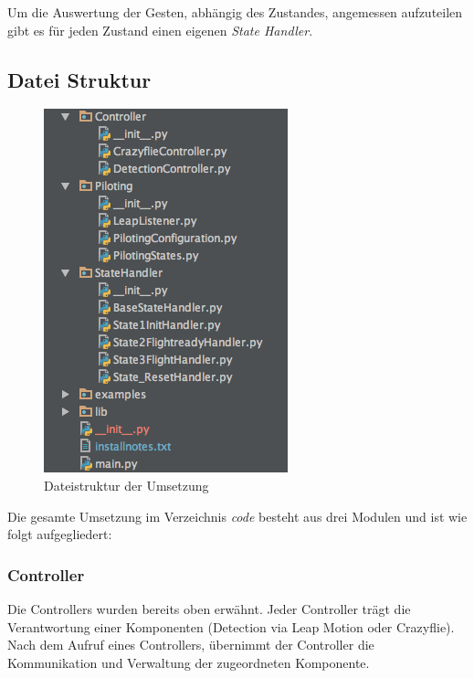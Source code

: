 Um die Auswertung der Gesten, abhängig des Zustandes, angemessen aufzuteilen gibt es für jeden Zustand einen eigenen \textit{State Handler}.

\subsection{Datei Struktur}
\begin{figure}
	\includegraphics[width=1.0\linewidth]{figures/poc/filestructure.png}
	\caption[Dateistruktur]{Dateistruktur der Umsetzung}
\end{figure}
Die gesamte Umsetzung im Verzeichnis \textit{code} besteht aus drei Modulen und ist wie folgt aufgegliedert:

\subsubsection{Controller}
Die Controllers wurden bereits oben erwähnt. Jeder Controller trägt die Verantwortung einer Komponenten (Detection via Leap Motion oder Crazyflie).
Nach dem Aufruf eines Controllers, übernimmt der Controller die Kommunikation und Verwaltung der zugeordneten Komponente.

